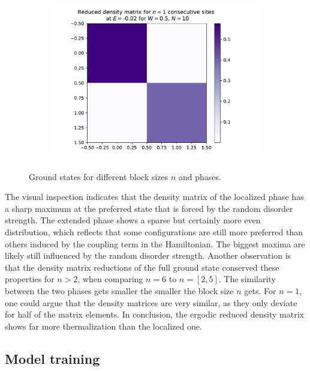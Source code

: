\documentclass[reprint,amsmath,amssymb,aps,prb]{revtex4-2}
\begin{document}
\begin{center}
\begin{figure}[h!]
\begin{subfigure}[c]{0.45\textwidth}
		\end{subfigure}
		\begin{subfigure}[c]{0.45\textwidth}
			\includegraphics[width=\linewidth]{../results/groundstates/N10n1_trainingset_groundstate_Wmax0.5}
		\end{subfigure}
		\caption{Ground states for different block sizes $n$ and phases.}
		\label{fig:groundstates_erg}
	\end{figure}
\end{center}

The visual inspection indicates that the density matrix of the localized phase has a sharp maximum at the preferred state that is forced by the random disorder strength. The extended phase shows a sparse but certainly more even distribution, which reflects that some configurations are still more preferred than others induced by the coupling term in the Hamiltonian. The biggest maxima are likely still influenced by the random disorder strength. Another observation is that the density matrix reductions of the full ground state conserved these properties for $n>2$, when comparing $n=6$ to $n=\left[2,5\right]$. The similarity between the two phases gets smaller the smaller the block size $n$ gets. For $n=1$, one could argue that the density matrices are very similar, as they only deviate for half of the matrix elements. In conclusion, the ergodic reduced density matrix shows far more thermalization than the localized one.

\subsection{Model training}\label{sec:loss_acc}
\end{document}

